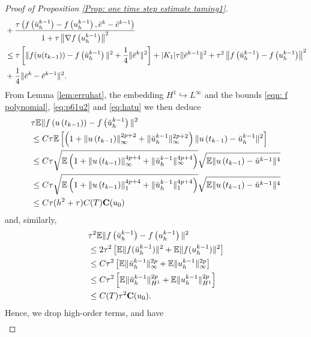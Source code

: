 \documentclass[reqno, 11pt]{amsart}
\theoremstyle{plain}
\theoremstyle{definition}
\theoremstyle{remark}
\numberwithin{equation}{section}
\numberwithin{theorem}{section}
\newcommand{\con}{\mathbf{C}}
\begin{document}
{\begin{proof}[Proof of Proposition \ref{Prop: one time  step estimate taming1}]
\begin{align}
&+\frac{\tau\left(f\left(\breve{u}_h^{k-1}\right)-f\left(u_h^{k-1}\right), \breve{e}^k-\breve{e}^{k-1}\right)}
{1+\tau\left\|\nabla f\left(u_h^{k-1}\right)\right\|^2}\notag\\
& \leq \tau\left[\|f(u(t_{k-1}))-f\left(\breve{u}_h^{k-1}\right)\|^2+\frac{1}{4}\| \breve{e}^k \|^2\right]+ |K_1|\tau\| \breve{e}^{k-1}\|^2+\tau^2\left\| f\left(\breve{u}_h^{k-1}\right)-f\left(u_h^{k-1}\right) \right\|^2 \notag\\
&+\frac{1}{4}\|\breve{e}^k-\breve{e}^{k-1}\|^2 .
\end{align}
From Lemma \ref{lem:erruhat}, the embedding $H^1\hookrightarrow L^\infty$  and the bounds \eqref{eqn: f polynomial}, \eqref{eq:p61u2} and \eqref{eq:hatu} we then deduce
\begin{align}\label{eqn:fuuhat}
& \tau \mathbb{E} \| f\left(u\left(t_{k-1}\right)\right)-f\left(\breve{u}_h^{k-1}\right) \|^2 \\
& \leq C \tau \mathbb{E}\left[\left(1+\left\|u\left(t_{k-1}\right)\right\|_{\infty}^{2p+2}+\|\breve{u}_h^{k-1}\|_{\infty}^{2p+2}\right)\|u\left(t_{k-1}\right)-\breve{u}_h^{k-1}\|^2\right] \notag\\
& \leq C \tau \sqrt{\mathbb{E}\left(1+\left\|u\left(t_{k-1}\right)\right\|_{\infty}^{4p+4}+\|\breve{u}_h^{k-1}\|_{\infty}^{4p+4}\right)}\sqrt{\mathbb{E}\|u\left(t_{k-1}\right)-\breve{u}^{k-1}\|^4}\notag \\
& \leq C \tau \sqrt{\mathbb{E}\left(1+\left\|u\left(t_{k-1}\right)\right\|_{1}^{4p+4}+\|\breve{u}_h^{k-1}\|_{1}^{4p+4}\right)}\sqrt{\mathbb{E}\|u\left(t_{k-1}\right)-\breve{u}^{k-1}\|^4} \notag\\
& \leq C \tau (h^2+\tau) C(T) \con(u_0) 
\end{align}
and, similarly, 
\begin{align}
&\tau^2 \mathbb{E}\|f\left(\breve{u}_h^{k-1}\right)-f\left(u_h^{k-1}\right)\|^2 \notag\\
&\leq 2\tau^2\left[\mathbb{E}\|f(\breve{u}_h^{k-1})\|^2+\mathbb{E}\|f(u_h^{k-1})\|^2\right]\notag\\
&\leq C\tau^2\left[\mathbb{E}\|\breve{u}_h^{k-1}\|_\infty^{2p}+\mathbb{E}\|u_h^{k-1}\|_\infty^{2p}\right]\notag\\
&\leq C\tau^2\left[\mathbb{E}\|\breve{u}_h^{k-1}\|_{{H}^1}^{2p}+\mathbb{E}\|u_h^{k-1}\|_{{H}^1}^{2p}\right]\notag\\
&\leq C(T) \tau^2 \con(u_0).
\end{align}
Hence, we drop high-order terms, and have
\begin{align}\label{eq:estJ}

\end{align}
\end{proof}}
\end{document}
